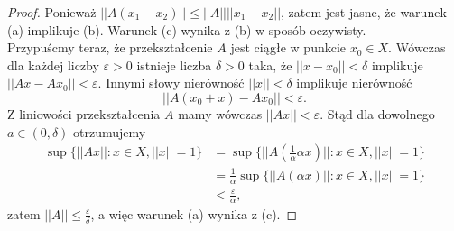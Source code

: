 \documentclass[leqno]{article}
\begin{document}
\begin{justify}
\begin{proof}
    Ponieważ $||A(x_1 - x_2)|| \leqslant ||A||||x_1 - x_2||$, zatem jest jasne, że warunek (a) implikuje (b).
    Warunek (c) wynika z (b) w sposób oczywisty. \\
    Przypuścmy teraz, że przekształcenie $A$ jest ciągłe w punkcie $x_0 \in X$. Wówczas
    dla każdej liczby $\varepsilon > 0$ istnieje liczba $\delta > 0$ taka, że $||x - x_0|| < \delta$ implikuje 
    $||Ax - Ax_0|| < \varepsilon$. Innymi słowy nierówność $||x|| < \delta$ implikuje nierówność 
    \[
        ||A(x_0 + x) - Ax_0|| < \varepsilon.
    \]
    Z liniowości przekształcenia $A$ mamy wówczas $||Ax|| < \varepsilon$. Stąd dla dowolnego $a \in (0, \delta)$ otrzumujemy 
    \begin{align*}
        \sup\{||Ax|| : x \in X, ||x|| = 1\} &= \sup\{||A(\frac{1}{\alpha}\alpha x)|| : x \in X, ||x|| = 1\} \\ 
                                            &= \frac{1}{\alpha}\sup\{||A(\alpha x)|| : x \in X, ||x|| = 1\} \\
                                            &< \frac{\varepsilon}{\alpha}, 
    \end{align*}
    zatem $||A|| \leqslant \frac{\varepsilon}{\delta}$, a więc warunek (a) wynika z (c).
\end{proof}


\end{justify}
\end{document}
